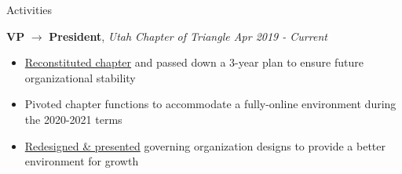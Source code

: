 \documentclass{resume}
\begin{document}
\begin{rSection}{Activities}

    {\bf VP} $\rightarrow$ {\bf President}, {\em Utah Chapter of Triangle \hfill Apr 2019 - Current}
    \vspace{-6pt}
    \begin{itemize}[nosep]
        \item \href{https://github.com/Spelkington/triangle/blob/master/Laws/Constitution.md}{Reconstituted chapter} and passed down a 3-year plan to ensure future organizational stability
        \item Pivoted chapter functions to accommodate a fully-online environment during the 2020-2021 terms
        \item \href{https://github.com/UtahTriangle/Laws/blob/main/Proposals/IGC/The%20Independent%20Greek%20Council.pdf}{Redesigned \& presented} governing organization designs to provide a better environment for growth
    \end{itemize}
    
    

    

\end{rSection}
\end{document}
